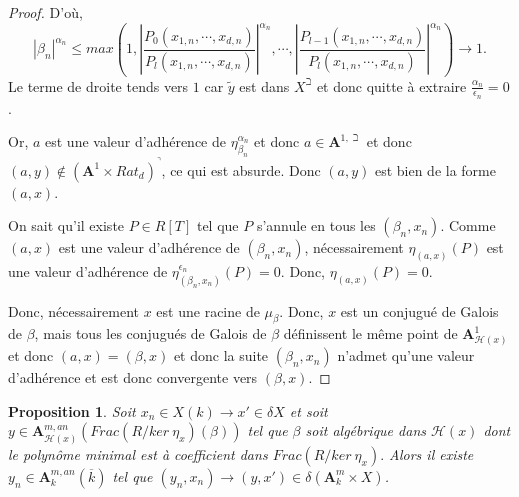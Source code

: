 \documentclass[11pt]{article}
\newcommand{\ana}{\mathbf{A}}
\newtheorem{prop}[thm]{Proposition}
\begin{document}
\begin{proof}
D'où,
\begin{equation*}
|\beta_n|^{\alpha_n} \leq max(1, | \frac{P_0(x_{1,n}, \cdots, x_{d,n})}{P_l(x_{1,n}, \cdots, x_{d,n})}|^{\alpha_n}, \cdots, | \frac{P_{l-1}(x_{1,n}, \cdots, x_{d,n})}{P_l(x_{1,n}, \cdots, x_{d,n})}|^{\alpha_n}) \rightarrow 1.
\end{equation*} 
Le terme de droite tends vers $1$ car $\tilde{y}$ est dans $X^\beth$ et donc quitte à extraire $\frac{\alpha_n}{\epsilon_n} = 0$.

Or, $a$ est une valeur d'adhérence de $\eta_{\beta_n}^{\alpha_n}$ et donc $a \in \ana^{1, \beth}$ et donc $(a,y) \notin (\ana^1 \times Rat_d)^\urcorner$, ce qui est absurde. Donc $(a,y)$ est bien de la forme $(a,x)$.

On sait qu'il existe $P \in R[T]$ tel que $P$ s'annule en tous les $(\beta_n, x_n)$. Comme $(a,x)$ est une valeur d'adhérence de $(\beta_n, x_n)$, nécessairement $\eta_{(a,x)}(P)$ est une valeur d'adhérence de $\eta_{(\beta_n,x_n)}^{\epsilon_n}(P) = 0$. Donc, $\eta_{(a,x)}(P) = 0$. 

Donc, nécessairement $x$ est une racine de $\mu_\beta$. Donc, $x$ est un conjugué de Galois de $\beta$, mais tous les conjugués de Galois de $\beta$ définissent le même point de $\ana^1_{\mathcal{H}(x)}$ et donc $(a, x) =(\beta, x)$ et donc la suite $(\beta_n, x_n)$ n'admet qu'une valeur d'adhérence et est donc convergente vers $(\beta, x)$.
\end{proof}
\begin{prop}\label{existence suite de points qui converge vers y dans ext alg de Frac}
Soit $x_n \in X(k) \rightarrow x' \in \delta X$ et soit $y \in \ana^{m, an}_{\mathcal{H}(x)}(Frac(R/ker~\eta_x)(\beta))$ tel que $\beta$ soit algébrique dans $\mathcal{H}(x)$ dont le polynôme minimal est à coefficient dans $Frac(R/ker~\eta_x).$ Alors il existe $y_n \in \ana^{m,an}_k(\overline{k})$ tel que $(y_n, x_n) \rightarrow (y,x') \in \delta (\ana^m_k \times X)$.
\end{prop}
\end{document}
